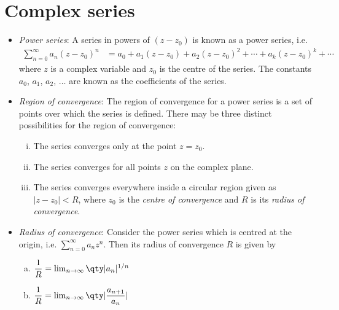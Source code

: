 \section{Complex series}
	\begin{itemize}
		\item \textit{Power series}: A series in powers of $(z-z_0)$ is known as a power series, i.e.
		\begin{align*}
			\sum_{n=0}^{\infty}{a_n(z-z_0)^n}&=a_0+a_1(z-z_0)+a_2(z-z_0)^2+\cdots+a_k(z-z_0)^k+\cdots
		\end{align*}
		where $z$ is a complex variable and $z_0$ is the centre of the series. The constants $a_0$, $a_1$, $a_2$, $\dots$ are known as the coefficients of the series.
		
		\item \textit{Region of convergence}: The region of convergence for a power series is a set of points over which the series is defined. There may be three distinct possibilities for the region of convergence:
		\begin{enumerate}[i.]
			\item The series converges only at the point $z=z_0$.
			\item The series converges for all points $z$ on the complex plane.
			\item The series converges everywhere inside a circular region given as $|z-z_0|<R$, where $z_0$ is the \textit{centre of convergence} and $R$ is its \textit{radius of convergence}.
		\end{enumerate}
		
		\item \textit{Radius of convergence}: Consider the power series which is centred at the origin, i.e. $\sum_{n=0}^{\infty}{a_nz^n}$. Then its radius of convergence $R$ is given by
		\begin{enumerate}[a)]
			\item $\dfrac{1}{R}=\lim_{n\to\infty}{\qty|a_n|^{1/n}}$
			
			\item $\dfrac{1}{R}=\lim_{n\to\infty}{\qty|\dfrac{a_{n+1}}{a_n}|}$
		\end{enumerate}
	\end{itemize}
	
